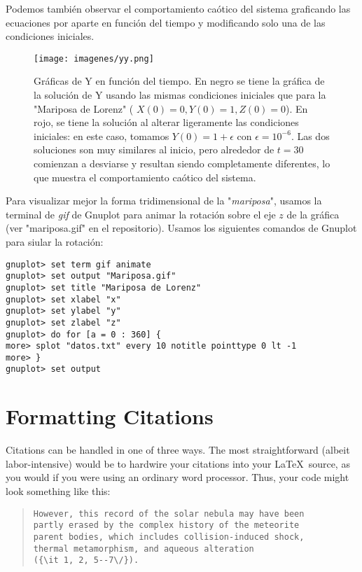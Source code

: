 \documentclass[letterpaper, 12pt]{article}
\begin{document}
{Podemos tambi\'en observar el comportamiento ca\'otico del sistema graficando las ecuaciones por aparte en funci\'on del tiempo y modificando solo una de las condiciones iniciales. 
\clearpage

\begin{figure} [t]
\centering
\texttt{[image: imagenes/yy.png]}
\caption{Gr\'aficas de Y en funci\'on del tiempo. En negro se tiene la gr\'afica de la soluci\'on de Y usando las mismas condiciones iniciales que para la "Mariposa de Lorenz" ( $X(0) = 0, Y(0) = 1, Z(0) = 0$). En rojo, se tiene la soluci\'on al alterar ligeramente las condiciones iniciales: en este caso, tomamos $Y(0) = 1 + \epsilon$ con $\epsilon = 10^{-6}$. Las dos soluciones son muy similares al inicio, pero alrededor de $t = 30$ comienzan a desviarse y resultan siendo completamente diferentes, lo que muestra el comportamiento ca\'otico del sistema.}
\end{figure}


\justify
Para visualizar mejor la forma tridimensional de la "\textit{mariposa}", usamos la terminal de \textit{gif} de Gnuplot para animar la rotaci\'on sobre el eje $z$ de la gr\'afica (ver "mariposa.gif" en el repositorio). Usamos los siguientes comandos de Gnuplot para siular la rotaci\'on:

\begin{lstlisting}
gnuplot> set term gif animate
gnuplot> set output "Mariposa.gif"
gnuplot> set title "Mariposa de Lorenz"
gnuplot> set xlabel "x"
gnuplot> set ylabel "y"
gnuplot> set zlabel "z"
gnuplot> do for [a = 0 : 360] {
more> splot "datos.txt" every 10 notitle pointtype 0 lt -1
more> }
gnuplot> set output
\end{lstlisting}



\section*{Formatting Citations}

Citations can be handled in one of three ways.  The most
straightforward (albeit labor-intensive) would be to hardwire your
citations into your \LaTeX\ source, as you would if you were using an
ordinary word processor.  Thus, your code might look something like
this:


\begin{quote}
\begin{verbatim}
However, this record of the solar nebula may have been
partly erased by the complex history of the meteorite
parent bodies, which includes collision-induced shock,
thermal metamorphism, and aqueous alteration
({\it 1, 2, 5--7\/}).
\end{verbatim}
\end{quote}


}
\end{document}
